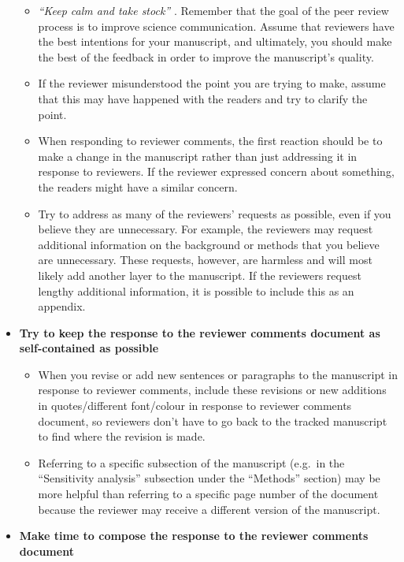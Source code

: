 \documentclass[
]{book}
\providecommand{\tightlist}{%
  \setlength{\itemsep}{0pt}\setlength{\parskip}{0pt}}
\begin{document}
\begin{itemize}
  \begin{itemize}
  \tightlist
  \item
    \emph{``Keep calm and take stock''} \citep{plos2021peerfeedback}. Remember that the goal of the peer review process is to improve science communication. Assume that reviewers have the best intentions for your manuscript, and ultimately, you should make the best of the feedback in order to improve the manuscript's quality.
  \item
    If the reviewer misunderstood the point you are trying to make, assume that this may have happened with the readers and try to clarify the point.
  \item
    When responding to reviewer comments, the first reaction should be to make a change in the manuscript rather than just addressing it in response to reviewers. If the reviewer expressed concern about something, the readers might have a similar concern.
  \item
    Try to address as many of the reviewers' requests as possible, even if you believe they are unnecessary. For example, the reviewers may request additional information on the background or methods that you believe are unnecessary. These requests, however, are harmless and will most likely add another layer to the manuscript. If the reviewers request lengthy additional information, it is possible to include this as an appendix.
  \end{itemize}
\item
  \textbf{Try to keep the response to the reviewer comments document as self-contained as possible}

  \begin{itemize}
  \tightlist
  \item
    When you revise or add new sentences or paragraphs to the manuscript in response to reviewer comments, include these revisions or new additions in quotes/different font/colour in response to reviewer comments document, so reviewers don't have to go back to the tracked manuscript to find where the revision is made.
  \item
    Referring to a specific subsection of the manuscript (e.g.~in the ``Sensitivity analysis'' subsection under the ``Methods'' section) may be more helpful than referring to a specific page number of the document because the reviewer may receive a different version of the manuscript.
  \end{itemize}
\item
  \textbf{Make time to compose the response to the reviewer comments document}


\end{itemize}
\end{document}
